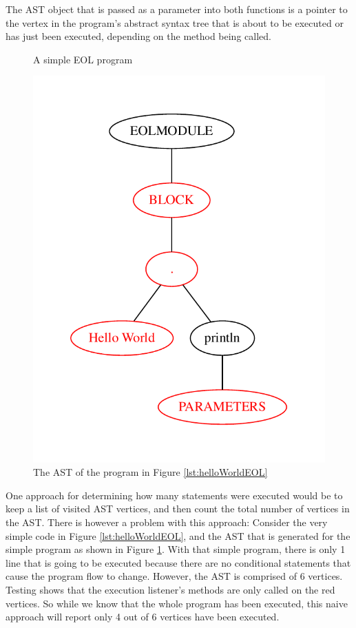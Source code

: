 The AST object that is passed as a parameter into both functions is a pointer to the vertex in the program's abstract syntax tree that is about to be executed or has just been executed, depending on the method being called. 

\begin{figure}
\centering
\begin{minipage}{.5\textwidth}
  \centering
  
  \caption{A simple EOL program}
  \label{lst:helloWorldEOL}
\end{minipage}%
\begin{minipage}{.5\textwidth}
  \centering
  \includegraphics[scale=0.5]{figures/HelloWorldAST.pdf}
  \caption{The AST of the program in Figure \ref{lst:helloWorldEOL}}
  \label{fig:helloWorldAST}
\end{minipage}
\end{figure}

One approach for determining how many statements were executed would be to keep a list of visited AST vertices, and then count the total number of vertices in the AST. There is however a problem with this approach: Consider the very simple code in Figure \ref{lst:helloWorldEOL}, and the AST that is generated for the simple program as shown in Figure \ref{fig:helloWorldAST}. With that simple program, there is only 1 line that is going to be executed because there are no conditional statements that cause the program flow to change. However, the AST is comprised of 6 vertices. Testing shows that the execution listener's methods are only called on the red vertices. So while we know that the whole program has been executed, this naive approach will report only 4 out of 6 vertices have been executed.

